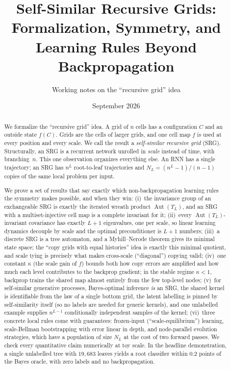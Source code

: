 \documentclass[11pt]{article}
\title{Self-Similar Recursive Grids:\\ Formalization, Symmetry, and Learning Rules Beyond Backpropagation}
\author{Working notes on the ``recursive grid'' idea}
\date{September 2026}
\theoremstyle{definition}
\newcommand{\Aut}{\operatorname{Aut}}
\newcommand{\Nint}{N_{L}}
\begin{document}
\maketitle

\begin{abstract}
We formalize the ``recursive grid'' idea. A grid of $n$ cells has a configuration $C$ and an
outside state $f(C)$. Grids are the cells of larger grids, and one cell map $f$ is used at every
position and every scale. We call the result a \emph{self-similar recursive grid} (SRG).
Structurally, an SRG is a recurrent network unrolled in \emph{scale} instead of time, with
branching~$n$. This one observation organizes everything else. An RNN has a single trajectory;
an SRG has $n^{L}$ root-to-leaf trajectories and $\Nint=(n^L-1)/(n-1)$ copies of the same
local problem per input.

We prove a set of results that say exactly which non-backpropagation learning rules the symmetry
makes possible, and when they win:
(i)~the invariance group of an exchangeable SRG is exactly the iterated wreath product
$\Aut(T_L)$, and an SRG with a multiset-injective cell map is a complete invariant for it;
(ii)~every $\Aut(T_L)$-invariant covariance has exactly $L{+}1$ eigenvalues, one per scale,
so linear learning dynamics decouple by scale and the optimal preconditioner is $L{+}1$ numbers;
(iii)~a discrete SRG is a tree automaton, and a Myhill--Nerode theorem gives its minimal state
space; the ``copy grids with equal histories'' idea is exactly this minimal quotient, and scale
tying is precisely what makes cross-scale (``diagonal'') copying valid;
(iv)~one constant $\kappa$ (the scale gain of $f$) bounds both how copy errors are amplified and
how much each level contributes to the backprop gradient; in the stable regime $\kappa<1$,
backprop trains the shared map almost entirely from the few top-level nodes;
(v)~for self-similar generative processes, Bayes-optimal inference \emph{is} an SRG, the shared
kernel is identifiable from the law of a single bottom grid, the latent labelling is pinned by
self-similarity itself (so no labels are needed for generic kernels), and one unlabelled example
supplies $n^{L-1}$ conditionally independent samples of the kernel;
(vi)~three concrete local rules come with guarantees: frozen-input (``scale-equilibrium'')
learning, scale-Bellman bootstrapping with error linear in depth, and node-parallel evolution
strategies, which have a population of size $\Nint$ at the cost of two forward passes.
We check every quantitative claim numerically at toy scale. In the headline demonstration, a
single unlabelled tree with $19{,}683$ leaves yields a root classifier within $0.2$ points of the
Bayes oracle, with zero labels and no backpropagation.
\end{abstract}
\end{document}
